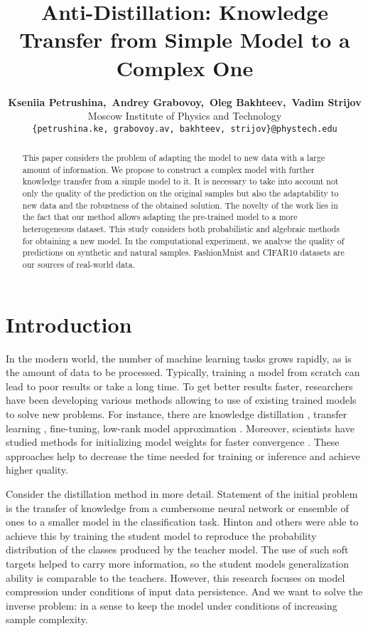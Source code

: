 \documentclass{article}
\title{Anti-Distillation: Knowledge Transfer from Simple Model to a Complex One}
\author{\textbf{Kseniia Petrushina,~Andrey Grabovoy,~Oleg Bakhteev,~Vadim Strijov} \\
	Moscow Institute of Physics and Technology \\
	\texttt{\{petrushina.ke,~grabovoy.av,~bakhteev,~strijov\}@phystech.edu}
}
\date{}
\begin{document}
\maketitle

\begin{abstract}
	This paper considers the problem of adapting the model to new data with a large amount of information. We propose to construct a complex model with further knowledge transfer from a simple model to it. It is necessary to take into account not only the quality of the prediction on the original samples but also the adaptability to new data and the robustness of the obtained solution. The novelty of the work lies in the fact that our method allows adapting the pre-trained model to a more heterogeneous dataset. This study considers both probabilistic and algebraic methods for obtaining a new model. In the computational experiment, we analyse the quality of predictions on synthetic and natural samples. FashionMnist and CIFAR10 datasets are our sources of real-world data.
\end{abstract}


\section{Introduction}
In the modern world, the number of machine learning tasks grows rapidly, as is the amount of data to be processed. Typically, training a model from scratch can lead to poor results or take a long time. To get better results faster, researchers have been developing various methods allowing to use of existing trained models to solve new problems. For instance, there are knowledge distillation \citep{hinton2015distilling, lopezpaz2016unifying}, transfer learning \citep{zhuang2019acomprehensive}, fine-tuning, low-rank model approximation \citep{yu2017oncompressing}. Moreover, scientists have studied methods for initializing model weights for faster convergence \citep{glorot2010understanding}. These approaches help to decrease the time needed for training or inference and achieve higher quality. 

Consider the distillation method in more detail. Statement of the initial problem is the transfer of knowledge from a cumbersome neural network or ensemble of ones to a smaller model in the classification task. Hinton and others were able to achieve this by training the student model to reproduce the probability distribution of the classes produced by the teacher model. The use of such soft targets helped to carry more information, so the student models generalization ability is comparable to the teachers. However, this research focuses on model compression under conditions of input data persistence. And we want to solve the inverse problem: in a sense to keep the model under conditions of increasing sample complexity.
\end{document}

